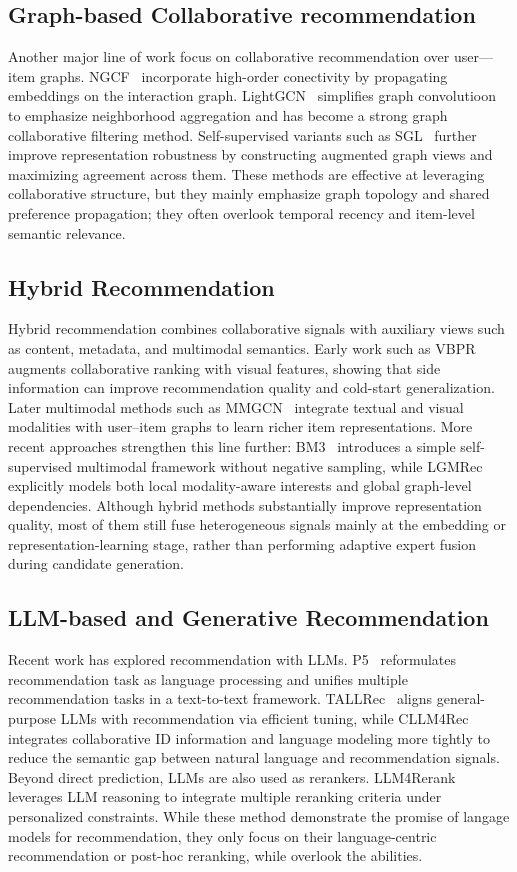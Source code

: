 \documentclass[sigconf,anonymous]{acmart}
\begin{document}
\subsection{Graph-based Collaborative recommendation}
Another major line of work focus on collaborative recommendation over user---item graphs. NGCF~\cite{ngcf} incorporate high-order conectivity by propagating embeddings on the interaction graph. LightGCN~\cite{lightgcn} simplifies graph convolutioon to emphasize neighborhood aggregation and has become a strong graph collaborative filtering method. Self-supervised variants such as SGL~\cite{sgl} further improve representation robustness by constructing augmented graph views and maximizing agreement across them. These methods are effective at leveraging collaborative structure, but they mainly emphasize graph topology and shared preference propagation; they often overlook temporal recency and item-level semantic relevance.

\subsection{Hybrid Recommendation}
Hybrid recommendation combines collaborative signals with auxiliary views such as content, metadata, and multimodal semantics. Early work such as VBPR~\cite{vbpr} augments collaborative ranking with visual features, showing that side information can improve recommendation quality and cold-start generalization. Later multimodal methods such as MMGCN~\cite{mmgcn} integrate textual and visual modalities with user--item graphs to learn richer item representations. More recent approaches strengthen this line further: BM3~\cite{bm3} introduces a simple self-supervised multimodal framework without negative sampling, while LGMRec~\cite{lgmrec} explicitly models both local modality-aware interests and global graph-level dependencies. Although hybrid methods substantially improve representation quality, most of them still fuse heterogeneous signals mainly at the embedding or representation-learning stage, rather than performing adaptive expert fusion during candidate generation.

\subsection{LLM-based and Generative Recommendation}
Recent work has explored recommendation with LLMs. P5~\cite{p5} reformulates recommendation task as language processing and unifies multiple recommendation tasks in a text-to-text framework. TALLRec~\cite{tallrec} aligns general-purpose LLMs with recommendation via efficient tuning, while CLLM4Rec~\cite{cllm4rec} integrates collaborative ID information and language modeling more tightly to reduce the semantic gap between natural language and recommendation signals. Beyond direct prediction, LLMs are also used as rerankers. LLM4Rerank~\cite{llm4rerank} leverages LLM reasoning to integrate multiple reranking criteria under personalized constraints. While these method demonstrate the promise of langage models for recommendation, they only focus on their language-centric recommendation or post-hoc reranking, while overlook the abilities.
\end{document}
